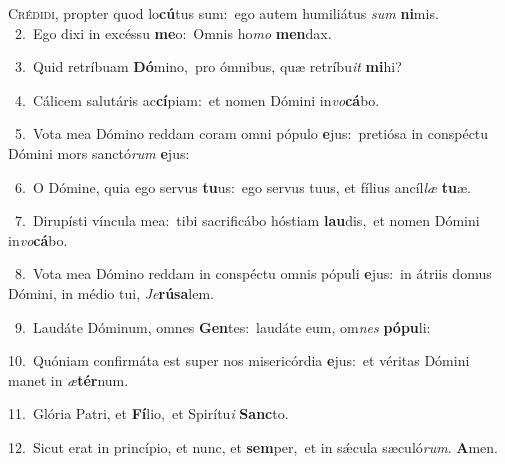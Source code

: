\lettrine{\initial\textcolor{\initialcolor}{C}}{rédidi,} propter quod lo\-\textbf{cú}\-tus sum:~\star ego autem humiliátus \textit{sum} \textbf{ni}\-mis.\\
{\numbfont\textcolor{\numbcolor}{~2.}}~Ego dixi in excéssu \textbf{me}\-o:~\star Omnis ho\textit{mo} \textbf{men}\-dax.\par
{\numbfont\textcolor{\numbcolor}{~3.}}~Quid retríbuam \textbf{Dó}\-mino,~\star pro ómnibus, quæ retríbu\textit{it} \textbf{mi}\-hi?\par
{\numbfont\textcolor{\numbcolor}{~4.}}~Cálicem salutáris ac\-\textbf{cí}\-piam:~\star et nomen Dómini in\-\textit{vo}\-\textbf{cá}bo.\par
{\numbfont\textcolor{\numbcolor}{~5.}}~Vota mea Dómino reddam coram omni pópulo \textbf{e}\-jus:~\star pretiósa in conspéctu Dómini mors sanctó\textit{rum} \textbf{e}\-jus:\par
{\numbfont\textcolor{\numbcolor}{~6.}}~O Dómine, quia ego servus \textbf{tu}\-us:~\star ego servus tuus, et fílius ancíl\textit{læ} \textbf{tu}\-æ.\par
{\numbfont\textcolor{\numbcolor}{~7.}}~Dirupísti víncula mea:~\dagger tibi sacrificábo hóstiam \textbf{lau}\-dis,~\star et nomen Dómini in\-\textit{vo}\-\textbf{cá}bo.\par
{\numbfont\textcolor{\numbcolor}{~8.}}~Vota mea Dómino reddam in conspéctu omnis pópuli \textbf{e}\-jus:~\star in átriis domus Dómini, in médio tui, \textit{Je}\-\textbf{rú}\textbf{sa}lem.\par
{\numbfont\textcolor{\numbcolor}{~9.}}~Laudáte Dóminum, omnes \textbf{Gen}\-tes:~\star laudáte eum, om\textit{nes} \textbf{pó}\-\textbf{pu}li:\par
{\numbfont\textcolor{\numbcolor}{10.}}~Quóniam confirmáta est super nos misericórdia \textbf{e}\-jus:~\star et véritas Dómini manet in \textit{æ}\-\textbf{tér}num.\par
{\numbfont\textcolor{\numbcolor}{11.}}~Glória Patri, et \textbf{Fí}\-lio,~\star et Spirítu\textit{i} \textbf{Sanc}\-to.\par
{\numbfont\textcolor{\numbcolor}{12.}}~Sicut erat in princípio, et nunc, et \textbf{sem}\-per,~\star et in sǽcula sæculó\-\textit{rum}\-. \textbf{A}\-men.\par
